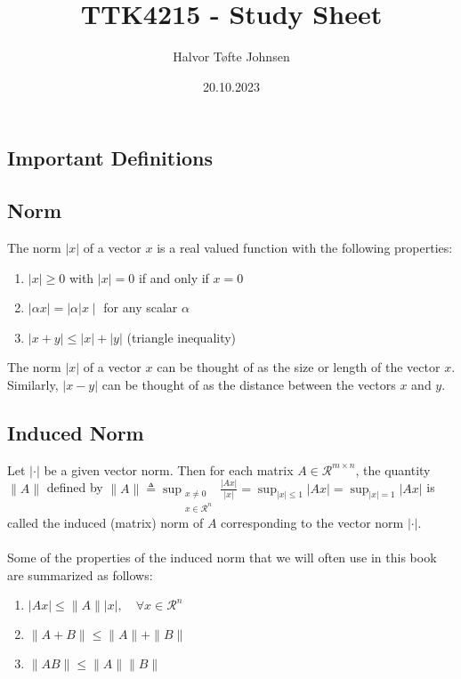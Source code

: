\documentclass[10pt]{article}
\title{\Huge TTK4215 - Study Sheet}
\author{Halvor Tøfte Johnsen}
\date{20.10.2023}
\begin{document}
\maketitle
\begin{multicols*}{2}
\section{Important Definitions}
\subsection{Norm}
The norm $|x|$ of a vector $x$ is a real valued function with the following properties:
\begin{enumerate}[label=(\roman*)]
	\item $|x| \geq 0$ with $|x|=0$ if and only if $x=0$
	\item $|\alpha x|=|\alpha| x \mid$ for any scalar $\alpha$
	\item $|x+y| \leq|x|+|y|$ (triangle inequality)
\end{enumerate}
The norm $|x|$ of a vector $x$ can be thought of as the size or length of the vector $x$. Similarly, $|x-y|$ can be thought of as the distance between the vectors $x$ and $y$.
\subsection{Induced Norm}
Let $|\cdot|$ be a given vector norm. Then for each matrix $A \in \mathcal{R}^{m \times n}$, the quantity $\|A\|$ defined by
\(
\|A\| \triangleq \sup _{\substack{x \neq 0 \\ x \in \mathcal{R}^n}} \frac{|A x|}{|x|}=\sup _{|x| \leq 1}|A x|=\sup _{|x|=1}|A x|
\)
is called the induced (matrix) norm of $A$ corresponding to the vector norm $|\cdot|$.
\\\\
Some of the properties of the induced norm that we will often use in this book are summarized as follows:
\begin{enumerate}[label=(\roman*)]
	\item $|A x| \leq\|A\||x|, \quad \forall x \in \mathcal{R}^n$
	\item $\|A+B\| \leq\|A\|+\|B\|$
	\item $\|A B\| \leq\|A\|\|B\|$
\end{enumerate}

\end{multicols*}
\end{document}
